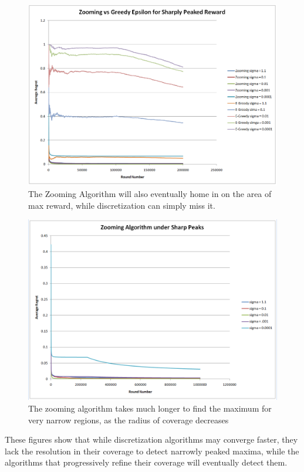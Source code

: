 \begin{figure}[!ht]
  \begin{center}
    \includegraphics[width=5 in]{figures/ZoomingEpsilonBump.png}
     \caption{The Zooming Algorithm will also eventually home in on the area of max reward, while discretization can simply miss it.}
     \label{fig:zoomebump}
  \end{center}
\end{figure}

\begin{figure}[!ht]
  \begin{center}
    \includegraphics[width=5 in]{figures/ZoomingBump.png}
     \caption{The zooming algorithm takes much longer to find the maximum for very narrow regions, as the radius of coverage decreases }
     \label{fig:zoombump2}
  \end{center}
\end{figure}



These figures show that while discretization algorithms may converge
faster, they lack the resolution in their coverage to detect narrowly
peaked maxima, while the algorithms that progressively refine their
coverage will eventually detect them.
